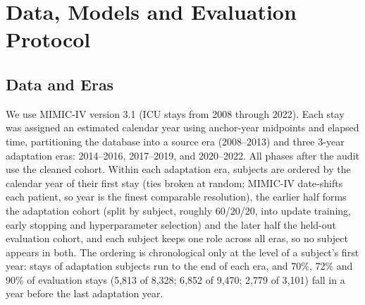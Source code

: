 \documentclass[10pt,a4paper,twocolumn]{article}
\begin{document}
	\section{Data, Models and Evaluation Protocol}
	\label{sec:methods}
	
	\subsection{Data and Eras}
	We use MIMIC-IV version 3.1 \citep{johnson2023mimic} (ICU stays from 2008 through 2022). Each stay was assigned an estimated calendar year using anchor-year midpoints and elapsed time, partitioning the database into a source era (2008--2013) and three 3-year adaptation eras: 2014--2016, 2017--2019, and 2020--2022. All phases after the audit use the cleaned cohort. Within each adaptation era, subjects are ordered by the calendar year of their first stay (ties broken at random; MIMIC-IV date-shifts each patient, so year is the finest comparable resolution), the earlier half forms the adaptation cohort (split by subject, roughly 60/20/20, into update training, early stopping and hyperparameter selection) and the later half the held-out evaluation cohort, and each subject keeps one role across all eras, so no subject appears in both. The ordering is chronological only at the level of a subject's first year: stays of adaptation subjects run to the end of each era, and 70\%, 72\% and 90\% of evaluation stays (5{,}813 of 8{,}328; 6{,}852 of 9{,}470; 2{,}779 of 3{,}101) fall in a year before the last adaptation year.
	
\end{document}
